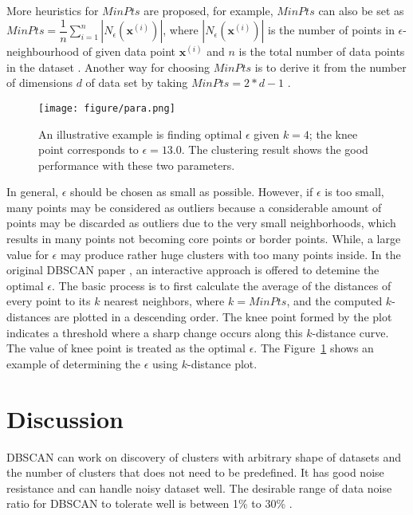 More heuristics for $MinPts$ are proposed, 
for example, $MinPts$ can also be set as $MinPts = 
\dfrac{1}{n}\sum_{i=1}^{n}|N_{\epsilon}(\mathbf{x}^{(i)})|$, where 
$|N_{\epsilon}(\mathbf{x}^{(i)})|$ is the number of points in 
$\epsilon$-neighbourhood of given data point $\mathbf{x}^{(i)}$ and $n$ is the 
total number of data points in the dataset
\cite{sawant2014adaptive}. Another way for choosing $MinPts$ is to derive it 
from the number of dimensions $d$ of data set by taking $MinPts = 2 * d - 1$ 
\cite{sander1998density}. 

\begin{figure}
	\centering
	\label{fig:para}
	\texttt{[image: figure/para.png]}
	\caption{An illustrative example is finding optimal $\epsilon$ given $k = 
	4$; the knee point corresponds to $\epsilon = 13.0$. The clustering result 
	shows the good performance with these two parameters.}
\end{figure}


In general, $\epsilon$ should be chosen as small as possible. However, if 
$\epsilon$ is too small, many points may be considered as outliers because a considerable amount of points may be discarded as outliers due to the very small neighborhoods, which results in many points not becoming core points or border points. While, a large value for $\epsilon$ may produce rather huge clusters with too many points inside.
In the original DBSCAN paper 
\cite{ester1996density}, an interactive approach is offered to detemine the 
optimal 
$\epsilon$.  The basic process is to first calculate the average of the 
distances of every point to its $k$ nearest neighbors, where $k = MinPts$, and 
the computed $k$-distances are plotted in a descending order. The knee point 
formed by the plot indicates a threshold where a sharp change occurs along this 
$k$-distance curve. The value of knee point is treated as the optimal 
$\epsilon$. The Figure~\ref{fig:para} shows an example of determining the 
$\epsilon$ using $k$-distance plot. 



\section{Discussion}

DBSCAN can work on discovery of clusters with arbitrary shape of datasets and 
the number of clusters that does not need to be predefined. It has good noise 
resistance and can handle noisy dataset well. The desirable range of data noise 
ratio for DBSCAN to tolerate well is between 1\% to 30\%
\cite{schubert2017dbscan}. 


